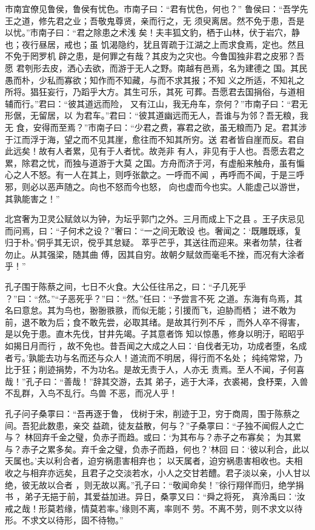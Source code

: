 \documentclass[a4paper,12pt,UTF8,twoside]{ctexbook}
\begin{document}
市南宜僚见鲁侯，鲁侯有忧色。市南子曰：“君有忧色，何也？” 鲁侯曰：“吾学先王之道，修先君之业；吾敬鬼尊贤，亲而行之，无 须臾离居。然不免于患，吾是以忧。”市南子曰：“君之除患之术浅 矣！夫丰狐文豹，栖于山林，伏于岩穴，静也；夜行昼居，戒也；虽 饥渴隐约，犹且胥疏于江湖之上而求食焉，定也。然且不免于罔罗机 辟之患，是何罪之有哉？其皮为之灾也。今鲁国独非君之皮邪？吾愿 君刳形去皮，洒心去欲，而游于无人之野。南越有邑焉，名为建德之 国。其民愚而朴，少私而寡欲；知作而不知藏，与而不求其报；不知 义之所适，不知礼之所将。猖狂妄行，乃蹈乎大方。其生可乐，其死 可葬。吾愿君去国捐俗，与道相辅而行。”君曰：“彼其道远而险， 又有江山，我无舟车，奈何？”市南子曰：“君无形倨，无留居，以 为君车。”君曰：“彼其道幽远而无人，吾谁与为邻？吾无粮，我无 食，安得而至焉？”市南子曰：“少君之费，寡君之欲，虽无粮而乃 足。君其涉于江而浮于海，望之而不见其崖，愈往而不知其所穷。送 君者皆自崖而反。君自此远矣！故有人者累，见有于人者忧。故尧非 有人，非见有于人也。吾愿去君之累，除君之忧，而独与道游于大莫 之国。方舟而济于河，有虚船来触舟，虽有惼心之人不怒。有一人在其上，则呼张歙之。一呼而不闻 ，再呼而不闻，于是三呼邪，则必以恶声随之。向也不怒而今也怒， 向也虚而今也实。人能虚己以游世，其孰能害之！”

北宫奢为卫灵公赋敛以为钟，为坛乎郭门之外。三月而成上下之县 。王子庆忌见而问焉，曰：“子何术之设？”奢曰：“一之间无敢设 也。奢闻之：‘既雕既琢，复归于朴。’侗乎其无识，傥乎其怠疑。 萃乎芒乎，其送往而迎来。来者勿禁，往者勿止。从其强梁，随其曲 傅，因其自穷。故朝夕赋敛而毫毛不挫，而况有大涂者乎！”

孔子围于陈蔡之间，七日不火食。大公任往吊之，曰：“子几死乎 ？”曰：“然。”“子恶死乎？”曰：“然。”任曰：“予尝言不死 之道。东海有鸟焉，其名曰意怠。其为鸟也，翂翂翐翐，而似无能；引援而飞，迫胁而栖； 进不敢为前，退不敢为后；食不敢先尝，必取其绪。是故其行列不斥 ，而外人卒不得害，是以免于患。直木先伐，甘井先竭。子其意者饰 知以惊愚，修身以明汙，昭昭乎如揭日月而行 ，故不免也。昔吾闻之大成之人曰：‘自伐者无功，功成者堕，名成 者亏。’孰能去功与名而还与众人！道流而不明居，得行而不名处； 纯纯常常，乃比于狂；削迹捐势，不为功名。是故无责于人，人亦无 责焉。至人不闻，子何喜哉！”孔子曰：“善哉！”辞其交游，去其 弟子，逃于大泽，衣裘褐，食杼栗，入兽不乱群，入鸟不乱行。鸟兽 不恶，而况人乎！

孔子问子桑雽曰：“吾再逐于鲁， 伐树于宋，削迹于卫，穷于商周，围于陈蔡之间。吾犯此数患，亲交 益疏，徒友益散，何与？”子桑雽曰：“子独不闻假人之亡与？ 林回弃千金之璧，负赤子而趋。或曰：‘为其布与？赤子之布寡矣； 为其累与？赤子之累多矣。弃千金之璧，负赤子而趋，何也？’林回 曰：‘彼以利合，此以天属也。’夫以利合者，迫穷祸患害相弃也； 以天属者，迫穷祸患害相收也。夫相收之与相弃亦远矣，且君子之交淡若水，小人之交甘若醴。君子淡以亲，小人甘以绝，彼无故以合者 ，则无故以离。”孔子曰：“敬闻命矣！”徐行翔佯而归，绝学捐书 ，弟子无挹于前，其爱益加进。异日，桑雽又曰：“舜之将死， 真泠禹曰：‘汝戒之哉！形莫若缘，情莫若率。’缘则不离，率则不 劳。不离不劳，则不求文以待形。不求文以待形，固不待物。”
\end{document}

